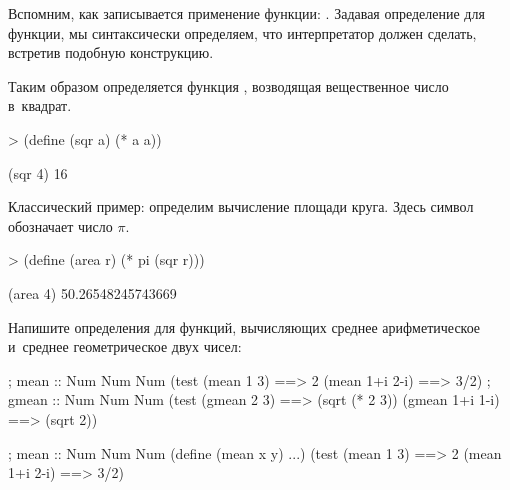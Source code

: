 Вспомним, как записывается применение функции: . Задавая определение для функции, мы синтаксически определяем, что интерпретатор должен сделать, встретив подобную конструкцию.

\begin{example}{%
Таким образом определяется функция , возводящая вещественное число в~квадрат.}
\begin{ExampleCode}
> (define (sqr a)
    (* a a))
\end{ExampleCode}
\REPL
  {(sqr 4)}
  {16}
\end{example}

\begin{example}{%
Классический пример: определим вычисление площади круга. Здесь символ  обозначает число $\pi$.}
\begin{ExampleCode}
> (define (area r)
    (* pi (sqr r)))
\end{ExampleCode}
\REPL
  {(area 4)}
  {50.26548245743669}
\end{example}

\begin{Assignment}
Напишите определения для функций, вычисляющих среднее арифметическое и~среднее геометрическое двух чисел:

\begin{Specification}
  ; mean :: Num Num \arrow Num
  (test 
    (mean 1 3)     ==> 2
    (mean 1+i 2-i) ==> 3/2)%
  ; gmean :: Num Num \arrow Num
  (test 
    (gmean 2 3)     ==> (sqrt (* 2 3))
    (gmean 1+i 1-i) ==> (sqrt 2))
\end{Specification}

\begin{Specification}
  ; mean :: Num Num \arrow Num
  (define (mean x y)  ...)
  (test 
    (mean 1 3)     ==> 2
    (mean 1+i 2-i) ==> 3/2)
\end{Specification}%

\end{Assignment}

